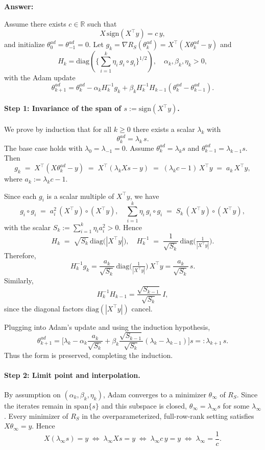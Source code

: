 \documentclass[a4paper]{article}
\begin{document}
\begin{itemize}
\textbf{Answer:}

Assume there exists $c\in\mathbb{R}$ such that
\[
X\,\mathrm{sign}(X^\top y)=c\,y,
\]
and initialize $\theta^{ad}_0=\theta^{ad}_{-1}=0$. Let $g_k=\nabla R_S(\theta^{ad}_k)=X^\top(X\theta^{ad}_k-y)$ and
\[
H_k=\mathrm{diag}\!\left(\Big\{\sum_{i=1}^k \eta_i\, g_i\circ g_i\Big\}^{1/2}\right),
\quad \alpha_k,\beta_k,\eta_k>0,
\]
with the Adam update
\[
\theta^{ad}_{k+1}=\theta^{ad}_k-\alpha_k H_k^{-1} g_k+\beta_k H_k^{-1}H_{k-1}(\theta^{ad}_k-\theta^{ad}_{k-1}).
\]

\paragraph{Step 1: Invariance of the span of $s:=\mathrm{sign}(X^\top y)$.}
We prove by induction that for all $k\ge 0$ there exists a scalar $\lambda_k$ with
\[
\theta^{ad}_k=\lambda_k\, s.
\]
The base case holds with $\lambda_0=\lambda_{-1}=0$. Assume $\theta^{ad}_k=\lambda_k s$ and $\theta^{ad}_{k-1}=\lambda_{k-1}s$.
Then
\[
g_k \;=\; X^\top(X\theta^{ad}_k-y)
\;=\; X^\top(\lambda_k X s - y)
\;=\; (\lambda_k c - 1)\, X^\top y
\;=\; a_k\, X^\top y,
\]
where $a_k:=\lambda_k c - 1$.

Since each $g_i$ is a scalar multiple of $X^\top y$, we have
\[
g_i\circ g_i \;=\; a_i^2\,(X^\top y)\circ(X^\top y),
\quad
\sum_{i=1}^k \eta_i\, g_i\circ g_i \;=\; S_k\, (X^\top y)\circ(X^\top y),
\]
with the scalar $S_k:=\sum_{i=1}^k \eta_i a_i^2>0$. Hence
\[
H_k \;=\; \sqrt{S_k}\,\mathrm{diag}\!\big(|X^\top y|\big),
\quad
H_k^{-1} \;=\; \frac{1}{\sqrt{S_k}}\,\mathrm{diag}\!\Big(\tfrac{1}{|X^\top y|}\Big).
\]
Therefore,
\[
H_k^{-1} g_k
= \frac{a_k}{\sqrt{S_k}}\, \mathrm{diag}\!\Big(\tfrac{1}{|X^\top y|}\Big)\, X^\top y
= \frac{a_k}{\sqrt{S_k}}\, s.
\]
Similarly,
\[
H_k^{-1}H_{k-1}
= \frac{\sqrt{S_{k-1}}}{\sqrt{S_k}}\, I,
\]
since the diagonal factors $\mathrm{diag}(|X^\top y|)$ cancel.

Plugging into Adam’s update and using the induction hypothesis,
\[
\theta^{ad}_{k+1}
= \Big[\lambda_k - \alpha_k \frac{a_k}{\sqrt{S_k}}
+ \beta_k \frac{\sqrt{S_{k-1}}}{\sqrt{S_k}}(\lambda_k-\lambda_{k-1})\Big] s
=:\lambda_{k+1}\, s.
\]
Thus the form is preserved, completing the induction.

\paragraph{Step 2: Limit point and interpolation.}
By assumption on $(\alpha_k,\beta_k,\eta_k)$, Adam converges to a minimizer $\theta_\infty$ of $R_S$.
Since the iterates remain in $\mathrm{span}\{s\}$ and this subspace is closed, $\theta_\infty=\lambda_\infty s$ for some $\lambda_\infty$.
Every minimizer of $R_S$ in the overparameterized, full-row-rank setting satisfies $X\theta_\infty=y$.
Hence
\[
X(\lambda_\infty s)=y
\;\Longleftrightarrow\;
\lambda_\infty X s = y
\;\Longleftrightarrow\;
\lambda_\infty c\, y = y
\;\Longleftrightarrow\;
\lambda_\infty = \frac{1}{c}.
\]


\end{itemize}
\end{document}
